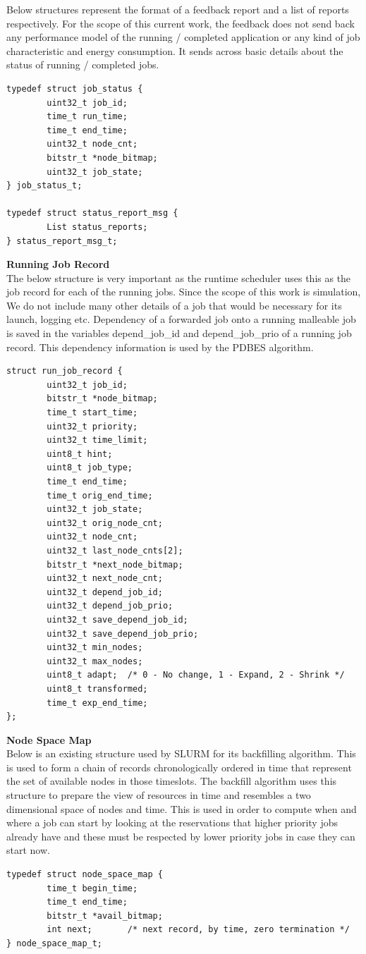 Below structures represent the format of a feedback report and a list of reports respectively. For the scope of this current work, the feedback does not send back any performance model of the running / completed application or any kind of job characteristic and energy consumption. It sends across basic details about the status of running / completed jobs.
\begin{lstlisting}[mathescape]
typedef struct job_status {
        uint32_t job_id;
        time_t run_time;
        time_t end_time;
        uint32_t node_cnt;
        bitstr_t *node_bitmap;
        uint32_t job_state;
} job_status_t;

typedef struct status_report_msg {
        List status_reports;
} status_report_msg_t;
\end{lstlisting}
\textbf{Running Job Record}\\
The below structure is very important as the runtime scheduler uses this as the job record for each of the running jobs. Since the scope of this work is simulation, We do not include many other details of a job that would be necessary for its launch, logging etc. Dependency of a forwarded job onto a running malleable job is saved in the variables depend\_job\_id and depend\_job\_prio of a running job record. This dependency information is used by the PDBES algorithm.
\begin{lstlisting}[mathescape]
struct run_job_record {
        uint32_t job_id;
        bitstr_t *node_bitmap;
        time_t start_time;
        uint32_t priority;
        uint32_t time_limit;
        uint8_t hint;
        uint8_t job_type;
        time_t end_time;
        time_t orig_end_time;
        uint32_t job_state;
        uint32_t orig_node_cnt;
        uint32_t node_cnt;
        uint32_t last_node_cnts[2];
        bitstr_t *next_node_bitmap;
        uint32_t next_node_cnt;
        uint32_t depend_job_id;
        uint32_t depend_job_prio;
        uint32_t save_depend_job_id;
        uint32_t save_depend_job_prio;
        uint32_t min_nodes;
        uint32_t max_nodes;
        uint8_t adapt;  /* 0 - No change, 1 - Expand, 2 - Shrink */
        uint8_t transformed;
        time_t exp_end_time;
};
\end{lstlisting}
\textbf{Node Space Map}\\
Below is an existing structure used by SLURM for its backfilling algorithm. This is used to form a chain of records chronologically ordered in time that represent the set of available nodes in those timeslots. The backfill algorithm uses this structure to prepare the view of resources in time and resembles a two dimensional space of nodes and time. This is used in order to compute when and where a job can start by looking at the reservations that higher priority jobs already have and these must be respected by lower priority jobs in case they can start now.
\begin{lstlisting}[mathescape]
typedef struct node_space_map {
        time_t begin_time;
        time_t end_time;
        bitstr_t *avail_bitmap;
        int next;       /* next record, by time, zero termination */
} node_space_map_t;
\end{lstlisting}

